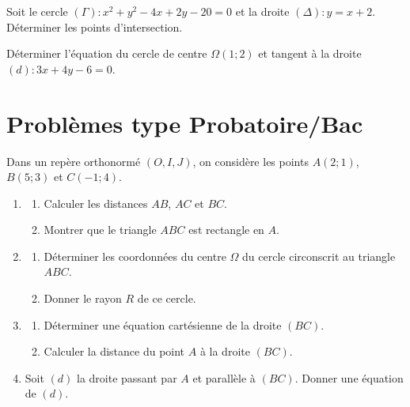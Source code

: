 \exo{}
Soit le cercle $(\Gamma) : x^2 + y^2 - 4x + 2y - 20 = 0$ et la droite $(\Delta) : y = x + 2$. Déterminer les points d'intersection.

\exo{}
Déterminer l'équation du cercle de centre $\Omega(1; 2)$ et tangent à la droite $(d) : 3x + 4y - 6 = 0$.

\section{Problèmes type Probatoire/Bac}

Dans un repère orthonormé $(O, I, J)$, on considère les points $A(2; 1)$, $B(5; 3)$ et $C(-1; 4)$.
\begin{enumerate}[label=\arabic*)]
    \item 
    \begin{enumerate}[label=\alph*)]
        \item Calculer les distances $AB$, $AC$ et $BC$.
        \item Montrer que le triangle $ABC$ est rectangle en $A$.
    \end{enumerate}
    \item 
    \begin{enumerate}[label=\alph*)]
        \item Déterminer les coordonnées du centre $\Omega$ du cercle circonscrit au triangle $ABC$.
        \item Donner le rayon $R$ de ce cercle.
    \end{enumerate}
    \item 
    \begin{enumerate}[label=\alph*)]
        \item Déterminer une équation cartésienne de la droite $(BC)$.
        \item Calculer la distance du point $A$ à la droite $(BC)$.
    \end{enumerate}
    \item Soit $(d)$ la droite passant par $A$ et parallèle à $(BC)$. Donner une équation de $(d)$.
\end{enumerate}

